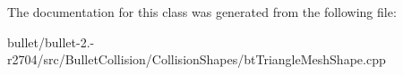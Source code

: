 The documentation for this class was generated from the following file\+:\begin{DoxyCompactItemize}
\item 
bullet/bullet-\/2.-\/r2704/src/\+Bullet\+Collision/\+Collision\+Shapes/bt\+Triangle\+Mesh\+Shape.\+cpp\end{DoxyCompactItemize}
